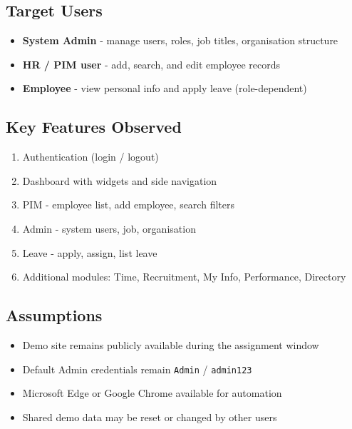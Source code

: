 ﻿\documentclass[11pt,a4paper]{article}
\begin{document}
\subsection{Target Users}
\begin{itemize}[noitemsep]
  \item \textbf{System Admin} - manage users, roles, job titles, organisation structure
  \item \textbf{HR / PIM user} - add, search, and edit employee records
  \item \textbf{Employee} - view personal info and apply leave (role-dependent)
\end{itemize}

\subsection{Key Features Observed}
\begin{enumerate}[noitemsep]
  \item Authentication (login / logout)
  \item Dashboard with widgets and side navigation
  \item PIM - employee list, add employee, search filters
  \item Admin - system users, job, organisation
  \item Leave - apply, assign, list leave
  \item Additional modules: Time, Recruitment, My Info, Performance, Directory
\end{enumerate}

\subsection{Assumptions}
\begin{itemize}[noitemsep]
  \item Demo site remains publicly available during the assignment window
  \item Default Admin credentials remain \texttt{Admin} / \texttt{admin123}
  \item Microsoft Edge or Google Chrome available for automation
  \item Shared demo data may be reset or changed by other users
\end{itemize}
\end{document}
